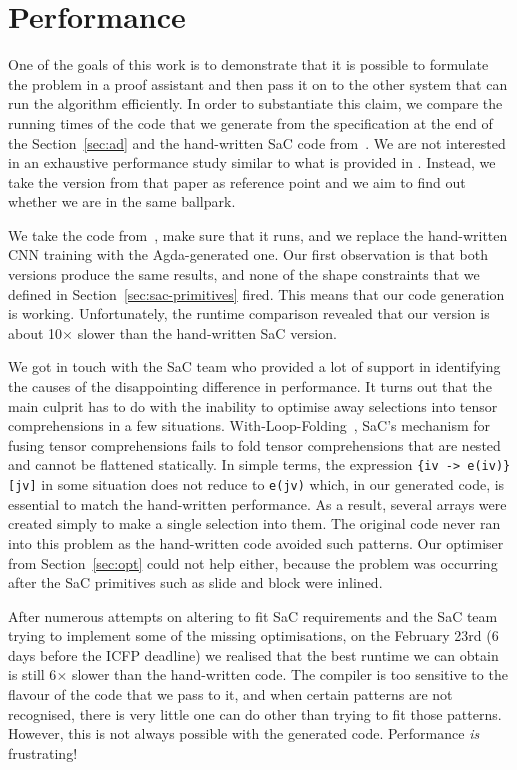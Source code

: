 \section{Performance\label{sec:performance}}

One of the goals of this work is to demonstrate that it is possible to formulate
the problem in a proof assistant and then pass it on to the other system that can
run the algorithm efficiently.  In order to substantiate this claim, we compare
the running times of the code that we generate from the specification at the end of the
Section~\ref{sec:ad} and the hand-written SaC code from~\cite{cnn-array}.
We are not interested in an exhaustive performance study similar to what is provided
in \cite{cnn-array}. Instead, we take the version from that paper as reference point 
and we aim to find out whether we are in the same ballpark.

We take the code from~\cite{cnn-array}, make sure that it runs, and we replace
the hand-written CNN training with the Agda-generated one. 
Our first observation is that both versions 
produce the same results, and none of the shape constraints
that we defined in Section~\ref{sec:sac-primitives} fired.  This means that our
code generation is working.  Unfortunately, the runtime comparison revealed that
our version is about 10$\times$ slower than the hand-written SaC version.

We got in touch with the SaC team who provided a lot of support in identifying
the causes of the disappointing difference in performance.  It turns out that the main culprit has
to do with the inability to optimise away selections into tensor comprehensions in a few situations.
With-Loop-Folding~\cite{wlf}, SaC's mechanism for fusing tensor comprehensions fails to fold
tensor comprehensions that are nested and cannot be flattened statically.
In simple terms, the expression \texttt{\{iv -> e(iv)\}[jv]} in some situation does not reduce to
\texttt{e(jv)} which, in our generated code, is essential to match the hand-written performance.
As a result, several arrays were created
simply to make a single selection into them.  The original code never ran into this
problem as the hand-written code avoided such patterns.  Our  optimiser
from Section~\ref{sec:opt} could not help either, because the problem was occurring after
the SaC primitives such as slide and block were inlined.

After numerous attempts on altering  to fit SaC requirements and the SaC
team trying to implement some of the missing optimisations, on the February 23rd
(6 days before the ICFP deadline) we realised that the best runtime we can
obtain is still 6$\times$ slower than the hand-written code.  The compiler is too
sensitive to the flavour of the code that we pass to it, and when certain patterns
are not recognised, there is very little one can do other than trying to fit
those patterns.  However, this is not always possible with the generated code.
Performance \emph{is} frustrating!

